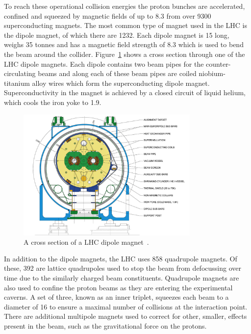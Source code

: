 To reach these operational collision energies the proton bunches are accelerated, confined and squeezed by magnetic fields of up to 8.3\Tesla{} from over 9300 superconducting magnets. 
The most common type of magnet used in the LHC is the dipole magnet, of which there are 1232.
Each dipole magnet is 15\m{} long, weighs 35 tonnes and has a magnetic field strength of 8.3\Tesla{} which is used to bend the beam around the collider. 
Figure~\ref{fig:LHCdipole} shows a cross section through one of the LHC dipole magnets.
Each dipole contains two beam pipes for the counter-circulating beams and along each of these beam pipes are coiled niobium-titanium alloy wires which form the superconducting dipole magnet. 
Superconductivity in the magnet is achieved by a closed circuit of liquid helium, which cools the iron yoke to 1.9\Kelvin{}.
\begin{figure}[htpb]
	\centering
	\includegraphics[width=0.8\textwidth]{Figures/LHCdipole}
	\caption[A cross section of a LHC dipole magnet.]{A cross section of a LHC dipole magnet~\cite{LHCdipolemagnet}. }
	\label{fig:LHCdipole}
\end{figure}

In addition to the dipole magnets, the LHC uses 858 quadrupole magnets. 
Of these, 392 are lattice quadrupoles used to stop the beam from defocussing over time due to the similarly charged beam constituents. 
Quadrupole magnets are also used to confine the proton beams as they are entering the experimental caverns. A set of three, known as an inner triplet, squeezes each beam to a diameter of 16\um{} to ensure a maximal number of collisions at the interaction point.
There are additional multipole magnets used to correct for other, smaller, effects present in the beam, such as the gravitational force on the protons. 

